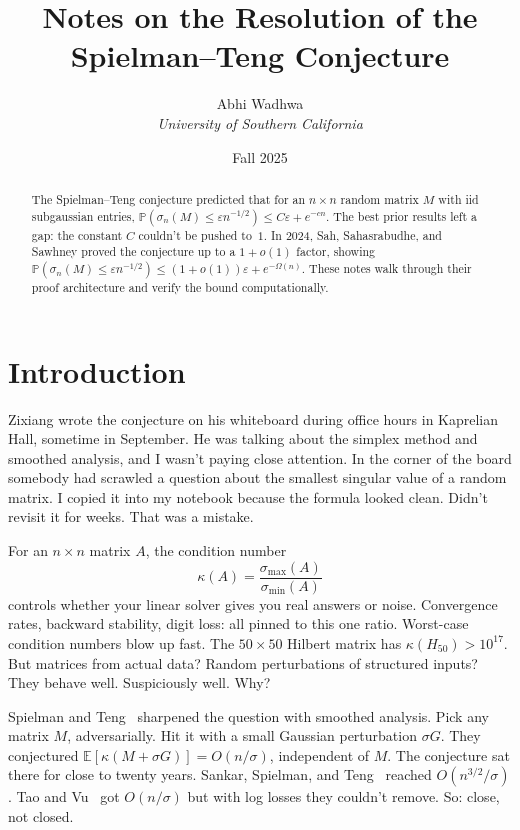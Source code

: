 \documentclass[11pt]{article}
\title{Notes on the Resolution of the Spielman--Teng Conjecture}
\author{Abhi Wadhwa\\
\textit{University of Southern California}}
\date{Fall 2025}
\theoremstyle{definition}
\theoremstyle{remark}
\newcommand{\E}{\mathbb{E}}
\newcommand{\Prob}{\mathbb{P}}
\newcommand{\sigmamin}{\sigma_{\min}}
\newcommand{\sigmamax}{\sigma_{\max}}
\begin{document}
\maketitle

\begin{abstract}
The Spielman--Teng conjecture predicted that for an $n \times n$ random matrix $M$
with iid subgaussian entries, $\Prob(\sigma_n(M) \le \varepsilon n^{-1/2}) \le C\varepsilon + e^{-cn}$.
The best prior results left a gap: the constant $C$ couldn't be pushed to~$1$.
In 2024, Sah, Sahasrabudhe, and Sawhney proved the conjecture up to a $1 + o(1)$ factor,
showing $\Prob(\sigma_n(M) \le \varepsilon n^{-1/2}) \le (1+o(1))\varepsilon + e^{-\Omega(n)}$.
These notes walk through their proof architecture and verify the bound computationally.
\end{abstract}

\section{Introduction}
\label{sec:intro}

Zixiang wrote the conjecture on his whiteboard during office hours in Kaprelian Hall, sometime in September.
He was talking about the simplex method and smoothed analysis, and I wasn't paying close attention.
In the corner of the board somebody had scrawled a question about the smallest singular value of a random matrix.
I copied it into my notebook because the formula looked clean. Didn't revisit it for weeks. That was a mistake.

For an $n \times n$ matrix $A$, the condition number
\[
  \kappa(A) = \frac{\sigmamax(A)}{\sigmamin(A)}
\]
controls whether your linear solver gives you real answers or noise. Convergence rates, backward stability, digit loss: all pinned to this one ratio.
Worst-case condition numbers blow up fast.
The $50 \times 50$ Hilbert matrix has $\kappa(H_{50}) > 10^{17}$.
But matrices from actual data? Random perturbations of structured inputs?
They behave well. Suspiciously well. Why?

Spielman and Teng~\cite{spielman2004smoothed} sharpened the question with smoothed analysis.
Pick any matrix $M$, adversarially. Hit it with a small Gaussian perturbation $\sigma G$.
They conjectured $\E[\kappa(M + \sigma G)] = O(n/\sigma)$, independent of $M$.
The conjecture sat there for close to twenty years.
Sankar, Spielman, and Teng~\cite{sankar2006smoothed} reached $O(n^{3/2}/\sigma)$.
Tao and Vu~\cite{tao2008condition} got $O(n/\sigma)$ but with log losses they couldn't remove.
So: close, not closed.
\end{document}
